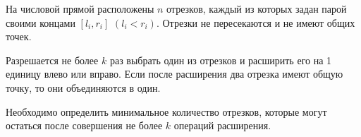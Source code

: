 На числовой прямой расположены $n$ отрезков, каждый из которых задан парой своими концами $[l_i, r_i]$ $(l_i < r_i)$. Отрезки не пересекаются и не имеют общих точек.

Разрешается не более $k$ раз выбрать один из отрезков и расширить его на 1 единицу влево или вправо. Если после расширения два отрезка имеют общую точку, то они объединяются в один.

Необходимо определить минимальное количество отрезков, которые могут остаться после совершения не более $k$ операций расширения.